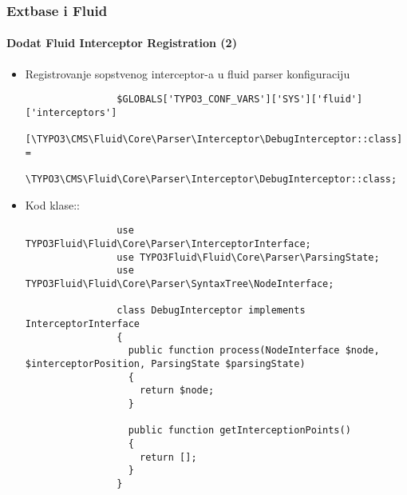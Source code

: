 \begin{frame}[fragile]
	\frametitle{Extbase i Fluid}
	\framesubtitle{Dodat Fluid Interceptor Registration (2)}

	\lstset{basicstyle=\tiny\ttfamily}

	\begin{itemize}

		\item Registrovanje sopstvenog interceptor-a u fluid parser konfiguraciju

			\begin{lstlisting}
				$GLOBALS['TYPO3_CONF_VARS']['SYS']['fluid']['interceptors']
			      [\TYPO3\CMS\Fluid\Core\Parser\Interceptor\DebugInterceptor::class] =
				  \TYPO3\CMS\Fluid\Core\Parser\Interceptor\DebugInterceptor::class;
			\end{lstlisting}

		\item Kod klase::

			\begin{lstlisting}
				use TYPO3Fluid\Fluid\Core\Parser\InterceptorInterface;
				use TYPO3Fluid\Fluid\Core\Parser\ParsingState;
				use TYPO3Fluid\Fluid\Core\Parser\SyntaxTree\NodeInterface;

				class DebugInterceptor implements InterceptorInterface
				{
				  public function process(NodeInterface $node, $interceptorPosition, ParsingState $parsingState)
				  {
				    return $node;
				  }

				  public function getInterceptionPoints()
				  {
				    return [];
				  }
				}
			\end{lstlisting}

	\end{itemize}

\end{frame}

